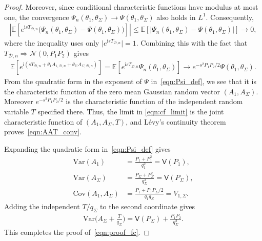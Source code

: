 \documentclass[11pt,onecolumn]{IEEEtran}
\newcommand{\calD}{\mathcal{D}}
\newcommand{\calF}{\mathcal{F}}
\newcommand{\calN}{\mathcal{N}}
\newcommand{\rmi}{\mathrm{i}}
\newcommand{\bbE}{\mathbb{E}}
\newcommand{\bbR}{\mathbb{R}}
\newcommand{\rvV}{\mathsf{V}}
\begin{document}
\begin{proof}
Moreover, since conditional characteristic functions have modulus at most
one, the convergence
\(\Psi_n(\theta_1,\theta_\Sigma)\to
\Psi(\theta_1,\theta_\Sigma)\) also holds in \(L^1\).
Consequently,
\begin{align}
 \left|
\bbE\left[
e^{\rmi sT_{\calD,n}}
\big(
\Psi_n(\theta_1,\theta_\Sigma)
-\Psi(\theta_1,\theta_\Sigma)
\big)
\right]
\right|  \le
\bbE\left[
\left|
\Psi_n(\theta_1,\theta_\Sigma)
-\Psi(\theta_1,\theta_\Sigma)
\right|
\right]
\to 0,
\end{align}
where the inequality uses only
\(\lvert e^{\rmi sT_{\calD,n}}\rvert=1\).
    Combining this with the fact that $T_{\calD,n}\Rightarrow\calN(0,P_1P_2)$ gives
    \begin{align}
        \bbE\left[e^{\rmi ( s T_{\calD,n} +\theta_1 A_{1,\calD,n}+\theta_\Sigma A_{\Sigma,\calD,n}   )} \right]=\bbE\left[ e^{\rmi s T_{\calD,n}}\Psi_n(\theta_1,\theta_\Sigma) \right]\to e^{-s^2 P_1P_2/2}\Psi(\theta_1,\theta_\Sigma). \label{eqn:cf_limit}
    \end{align}
    From the quadratic form in the exponent of $\Psi$ in~\eqref{eqn:Psi_def},  we see that it is the characteristic function of the zero mean Gaussian random vector $(A_1,A_\Sigma)$. Moreover $e^{-s^2P_1P_2/2}$ is the characteristic function of the independent random variable $T$ specified there. Thus, the limit in \eqref{eqn:cf_limit} is the joint characteristic function of  $(A_1,A_\Sigma,T)$, and L\'evy's continuity theorem proves~\eqref{eqn:AAT_conv}. 

    Expanding the quadratic form in~\eqref{eqn:Psi_def} gives
    \begin{align}
        \mathrm{Var}(A_1)  &= \frac{P_1+P_1^2}{q_1^2}=\rvV(P_1), \\
       \mathrm{Var}(A_\Sigma)  &= \frac{P_\Sigma+P_\Sigma^2}{q_\Sigma^2}=\rvV(P_\Sigma) ,\\ 
       \mathrm{Cov}(A_1, A_\Sigma) & = \frac{P_1 + P_1P_\Sigma/2}{q_1 q_\Sigma} = V_{1,\Sigma}.
    \end{align}
    Adding the independent $T/q_\Sigma$ to the second coordinate gives 
    \begin{align}
           \mathrm{Var}\bigg(A_\Sigma+\frac{T}{q_\Sigma} \bigg) =\rvV(P_\Sigma) +\frac{P_1P_2}{q_\Sigma^2}.
    \end{align}
    This completes the proof of~\eqref{eqn:proof_fc}.
\end{proof}
\end{document}
